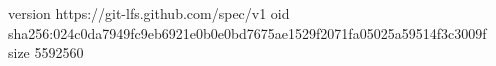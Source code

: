 version https://git-lfs.github.com/spec/v1
oid sha256:024c0da7949fc9eb6921e0b0e0bd7675ae1529f2071fa05025a59514f3c3009f
size 5592560
